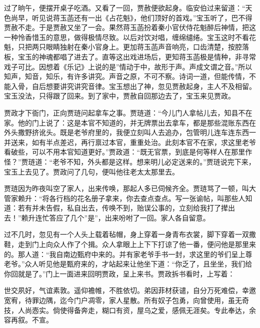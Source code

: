 \begin{parag}
    过了晌午，便摆开桌子吃酒。又看了一回，贾赦便欲起身。临安伯过来留道：“天色尚早，听见说蒋玉菡还有一出《占花魁》，他们顶好的首戏。”宝玉听了，巴不得贾赦不走。于是贾赦又坐了一会。果然蒋玉菡扮着秦小官伏侍花魁醉后神情，把这一种怜香惜玉的意思，做得极情尽致。以后对饮对唱，缠绵缱绻。宝玉这时不看花魁，只把两只眼睛独射在秦小官身上。更加蒋玉菡声音响亮，口齿清楚，按腔落板，宝玉的神魂都唱了进去了。直等这出戏进场后，更知蒋玉菡极是情种，非寻常戏子可比。因想着《乐记》上说的是”情动于中，故形于声。声成文谓之音。”所以知声，知音，知乐，有许多讲究。声音之原，不可不察。诗词一道，但能传情，不能入骨，自后想要讲究讲究音律。宝玉想出了神，忽见贾赦起身，主人不及相留。宝玉没法，只得跟了回来。到了家中，贾赦自回那边去了，宝玉来见贾政。
\end{parag}


\begin{parag}
    贾政才下衙门，正向贾琏问起拿车之事。贾琏道：“今儿门人拿帖儿去，知县不在家。他的门上说了：这是本官不知道的，并无牌票出去拿车，都是那些混账东西在外头撒野挤讹头。既是老爷府里的，我便立刻叫人去追办，包管明儿连车连东西一并送来，如有半点差迟，再行禀过本官，重重处治。此刻本官不在家，求这里老爷看破些，可以不用本官知道更好。”贾政道：“既无官票，到底是何等样人在那里作怪？”贾琏道：“老爷不知，外头都是这样。想来明儿必定送来的。”贾琏说完下来，宝玉上去见了。贾政问了几句，便叫他往老太太那里去。
\end{parag}


\begin{parag}
    贾琏因为昨夜叫空了家人，出来传唤，那起人多已伺候齐全。贾琏骂了一顿，叫大管家赖升：“将各行档的花名册子拿来，你去查点查点。写一张谕帖，叫那些人知道：若有并未告假，私自出去，传唤不到，贻误公事的，立刻给我打了撵出去！”赖升连忙答应了几个”是”，出来吩咐了一回。家人各自留意。
\end{parag}


\begin{parag}
    过不几时，忽见有一个人头上载着毡帽，身上穿着一身青布衣裳，脚下穿着一双撒鞋，走到门上向众人作了个揖。众人拿眼上上下下打谅了他一番，便问他是那里来的。那人道：“我自南边甄府中来的。并有家老爷手书一封，求这里的爷们呈上尊老爷。”众人听见他是甄府来的，才站起来让他坐下道：“你乏了，且坐坐，我们给你回就是了。”门上一面进来回明贾政，呈上来书。贾政拆书看时，上写着：
\end{parag}


\begin{qute2sp}
    世交夙好，气谊素敦。遥仰襜帷，不胜依切。弟因菲材获谴，自分万死难偿，幸邀宽宥，待罪边隅，迄今门户凋零，家人星散。所有奴子包勇，向曾使用，虽无奇技，人尚悫实。倘使得备奔走，糊口有资，屋乌之爱，感佩无涯矣。专此奉达，余容再叙。不宣。
\end{qute2sp}


